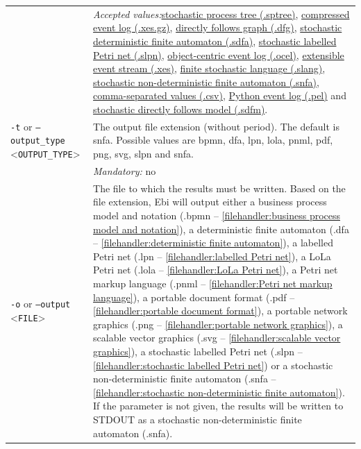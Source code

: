{\begin{tabularx}{\linewidth}{lX}
&\textit{Accepted values:}\quad \hyperref[filehandler:stochastic process tree]{stochastic process tree (.sptree)}, \hyperref[filehandler:compressed event log]{compressed event log (.xes.gz)}, \hyperref[filehandler:directly follows graph]{directly follows graph (.dfg)}, \hyperref[filehandler:stochastic deterministic finite automaton]{stochastic deterministic finite automaton (.sdfa)}, \hyperref[filehandler:stochastic labelled Petri net]{stochastic labelled Petri net (.slpn)}, \hyperref[filehandler:object-centric event log]{object-centric event log (.ocel)}, \hyperref[filehandler:extensible event stream]{extensible event stream (.xes)}, \hyperref[filehandler:finite stochastic language]{finite stochastic language (.slang)}, \hyperref[filehandler:stochastic non-deterministic finite automaton]{stochastic non-deterministic finite automaton (.snfa)}, \hyperref[filehandler:comma-separated values]{comma-separated values (.csv)}, \hyperref[filehandler:Python event log]{Python event log (.pel)} and \hyperref[filehandler:stochastic directly follows model]{stochastic directly follows model (.sdfm)}.\\
\texttt{-t} or \texttt{--output\_type} <\texttt{OUTPUT\_TYPE}> &
The output file extension (without period). The default is snfa. Possible values are bpmn, dfa, lpn, lola, pnml, pdf, png, svg, slpn and snfa.\\
&\textit{Mandatory:} \quad no\\
\texttt{-o} or \texttt{--output} <\texttt{FILE}> &
The file to which the results must be written. Based on the file extension, Ebi will output either a business process model and notation (.bpmn -- \cref{filehandler:business process model and notation}), a deterministic finite automaton (.dfa -- \cref{filehandler:deterministic finite automaton}), a labelled Petri net (.lpn -- \cref{filehandler:labelled Petri net}), a LoLa Petri net (.lola -- \cref{filehandler:LoLa Petri net}), a Petri net markup language (.pnml -- \cref{filehandler:Petri net markup language}), a portable document format (.pdf -- \cref{filehandler:portable document format}), a portable network graphics (.png -- \cref{filehandler:portable network graphics}), a scalable vector graphics (.svg -- \cref{filehandler:scalable vector graphics}), a stochastic labelled Petri net (.slpn -- \cref{filehandler:stochastic labelled Petri net}) or a stochastic non-deterministic finite automaton (.snfa -- \cref{filehandler:stochastic non-deterministic finite automaton}).
If the parameter is not given, the results will be written to STDOUT as a stochastic non-deterministic finite automaton (.snfa).\\

\end{tabularx}}
